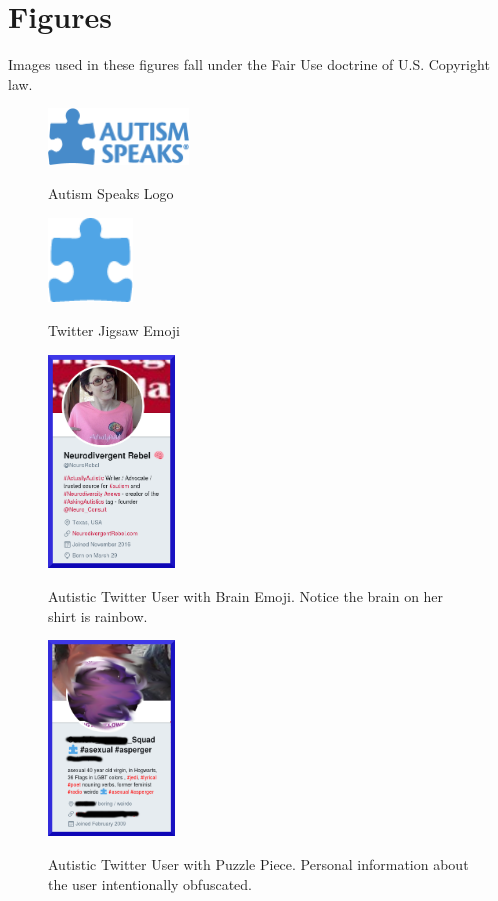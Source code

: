 \section{Figures}
\label{apx:figures}

Images used in these figures fall under the Fair Use doctrine of U.S. Copyright law.

\begin{figure}[ht]
\caption{Autism Speaks Logo}
\centering
\includegraphics[width=0.333\textwidth]{aspeaks}
\label{fig:aspeaks}
\end{figure}

\begin{figure}[ht]
\caption{Twitter Jigsaw Emoji}
\centering
\includegraphics[width=0.2\textwidth]{twitterJigsaw}
\label{fig:twitterJigsaw}
\end{figure}

\begin{figure}[ht]
\caption{Autistic Twitter User with Brain Emoji. Notice the brain on her shirt is rainbow.}
\centering
\includegraphics[width=0.3\textwidth]{rebel.png}
\label{fig:rebel}
\end{figure}

\begin{figure}[ht]
\caption{Autistic Twitter User with Puzzle Piece. Personal information about the user intentionally obfuscated.}
\centering
\includegraphics[width=0.3\textwidth]{covfefe.png}
\label{fig:covfefe}
\end{figure}


